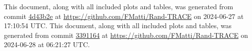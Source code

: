 This document, along with all included plots and tables, was generated from commit \href{https://github.com/FMatti/Rand-TRACE/tree/4d43b2e}{4d43b2e} at \url{https://github.com/FMatti/Rand-TRACE} on 2024-06-27 at 17:10:54 UTC.
This document, along with all included plots and tables, was generated from commit \href{https://github.com/FMatti/Rand-TRACE/tree/3391164}{3391164} at \url{https://github.com/FMatti/Rand-TRACE} on 2024-06-28 at 06:21:27 UTC.
